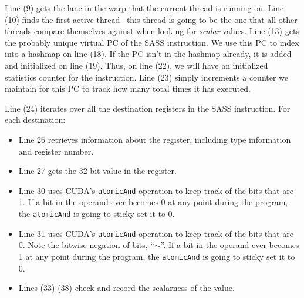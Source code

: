 Line (9) gets the lane in the warp that the current thread is running
on.  Line (10) finds the first active thread-- this thread is going to
be the one that all other threads compare themselves against when
looking for \emph{scalar} values.  Line (13) gets the probably unique
virtual PC of the SASS instruction.  We use this PC to index into a
hashmap on line (18).  If the PC isn't in the hashmap already, it is
added and initialized on line (19).  Thus, on line (22), we will have
an initialized statistics counter for the instruction.  Line (23)
simply increments a counter we maintain for this PC to track how many
total times it has executed.

Line (24) iterates over all the destination registers in the SASS
instruction.  For each destination:
\begin{itemize}
\item Line 26 retrieves information about the register, including type
  information and register number.
\item Line 27 gets the 32-bit value in the register.
\item Line 30 uses CUDA's \texttt{atomicAnd} operation to keep track
  of the bits that are 1.  If a bit in the operand ever becomes 0 at
  any point during the program, the \texttt{atomicAnd} is going to
  sticky set it to 0.
\item Line 31 uses CUDA's \texttt{atomicAnd} operation to keep track
  of the bits that are 0.  Note the bitwise negation of bits, ``$\sim$''.  If a bit in the operand ever becomes 1 at
  any point during the program, the \texttt{atomicAnd} is going to
  sticky set it to 0.
\item Lines (33)-(38) check and record the scalarness of the value.
\end{itemize}

